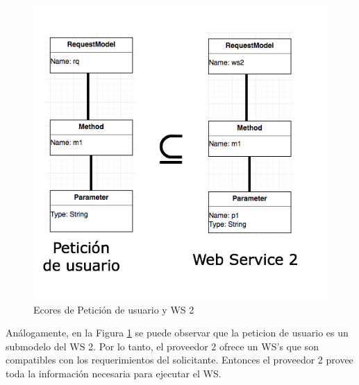 \begin{figure}[!h] 
	\begin{center}
		\includegraphics [scale=0.60]{imagenes/Ecores_de_Peticion_de_usuario_y_WS_2.jpg}
	\end{center}
	\caption{Ecores de Petición de usuario y WS 2}
	\label{fig:Ecores de Petición de usuario y WS 2}
\end{figure} 

Análogamente, en la Figura \ref{fig:Ecores de Petición de usuario y WS 2} se puede observar que la peticion de usuario es un submodelo del WS 2. Por lo tanto, el proveedor 2 ofrece un WS's que son compatibles con los requerimientos del solicitante. Entonces el proveedor 2 provee toda la información necesaria para ejecutar el WS.